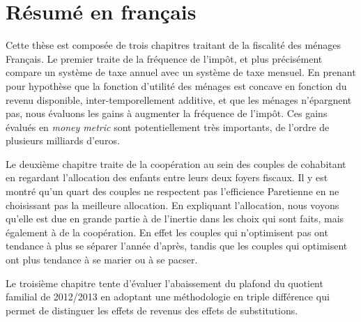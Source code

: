 
\ifx\isDoubleEmbedded\undefined



\else \fi




\chapter*{Résumé en français}
Cette thèse est composée de trois chapitres traitant de la fiscalité des ménages Français. Le premier traite de la fréquence de l'impôt, et plus précisément compare un système de taxe annuel avec un système de taxe mensuel. En  prenant pour hypothèse que la fonction d'utilité des ménages est concave en fonction du revenu disponible, inter-temporellement additive, et que les ménages n'épargnent pas, nous évaluons les gains à augmenter la fréquence de l'impôt. Ces gains évalués en \emph{money metric} sont potentiellement très importants, de l'ordre de plusieurs milliards d'euros.


Le deuxième chapitre traite de la coopération au sein des couples de cohabitant en regardant l'allocation des enfants entre leurs deux foyers fiscaux. Il y est montré qu'un quart des couples ne respectent pas l'efficience Paretienne en ne choisissant pas la meilleure allocation. En expliquant l'allocation, nous voyons qu'elle est due en grande partie à de l'inertie dans les choix qui sont faits, mais également à de la coopération. En effet les couples qui n'optimisent pas ont tendance à plus se séparer l'année d'après, tandis que les couples qui optimisent ont plus tendance à se marier ou à se pacser. 



Le troisième chapitre tente d'évaluer l'abaissement du plafond du quotient familial de 2012/2013 en adoptant une méthodologie en triple différence qui permet de distinguer les effets de revenus des effets de substitutions.



